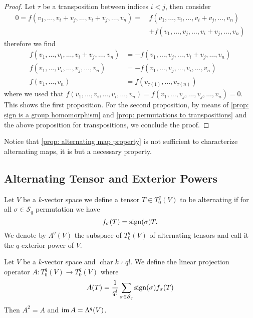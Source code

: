 \begin{proof}
  Let \(\tau\) be a transposition between indices \(i < j\), then consider
  \begin{align*}
    0 = f(v_1, \dots, v_i + v_j, \dots, v_i + v_j, \dots, v_n)
    =\, & f(v_1, \dots, v_i, \dots, v_i + v_j, \dots, v_n) \\
      & + f(v_1, \dots, v_j, \dots, v_i + v_j, \dots, v_n)
  \end{align*}
  therefore we find
  \begin{align*}
    f(v_1, \dots, v_i, \dots, v_i + v_j, \dots, v_n) 
    &= - f(v_1, \dots, v_j, \dots, v_i + v_j, \dots, v_n) \\
    f(v_1, \dots, v_i, \dots, v_j, \dots, v_n)
    &= - f(v_1, \dots, v_j, \dots, v_i, \dots, v_n) \\
    f(v_1, \dots, v_n)
    &= f(v_{\tau(1)}, \dots, v_{\tau(n)})
  \end{align*}
  where we used that \(f(v_1, \dots, v_i, \dots, v_i, \dots, v_n) = f(v_1,
  \dots, v_j, \dots, v_j, \dots, v_n) = 0\). This shows the first proposition.
  For the second proposition, by means of \cref{prop: sign is a group
  homomorphism} and \cref{prop: permutations to transpositions} and the above
  proposition for transpositions, we conclude the proof.
\end{proof}

\begin{remark}
  Notice that \cref{prop: alternating map property} is not sufficient to
  characterize alternating maps, it is but a necessary property.
\end{remark}

\subsection{Alternating Tensor and Exterior Powers}

\begin{definition}
  \label{def: alternating tensor}
  Let \(V\) be a \(k\)-vector space we define a tensor \(T \in T_0^q(V)\) to be
  alternating if for all \(\sigma \in \mathcal S_q\) permutation we have
  \[
    f_\sigma(T) = \operatorname{sign}(\sigma) T.
  \] 
  We denote by \(\Lambda^q(V)\) the subspace of \(T_0^q(V)\) of alternating
  tensors and call it the \(q\)-exterior power of \(V\).
\end{definition}

\begin{proposition}
  \label{prop: alternating projection}
  Let \(V\) be a \(k\)-vector space and \(\operatorname{char} k \nmid q!\). We
  define the linear projection operator \(A: T_0^q(V) \to T_0^q(V)\) where
  \[
    A(T) = \frac{1}{q!} \sum_{\sigma \in \mathcal S_q} \operatorname{sign}(\sigma)
    f_\sigma(T)
  \] 
  Then \(A^2 = A\) and \(\operatorname{im} A = \Lambda^q(V)\).
\end{proposition}

